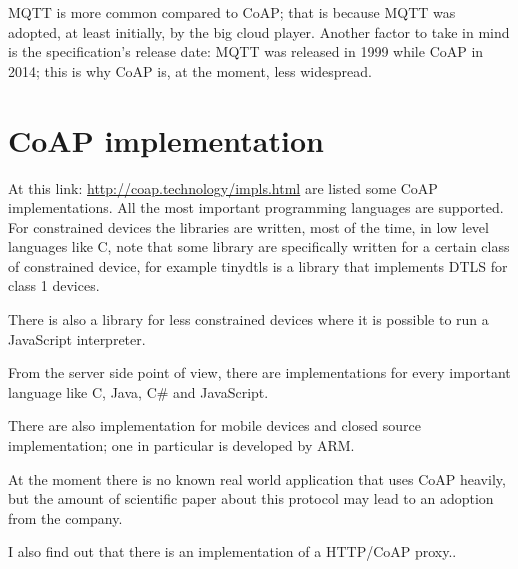 	MQTT is more common compared to CoAP; that is because MQTT was adopted, at least initially, by the big cloud player.\newline
	Another factor to take in mind is the specification's release date: MQTT was released in 1999 while CoAP in 2014; this is why CoAP is, at the moment, less widespread.\newline
	
	\section{CoAP implementation}
	At this link: \url{http://coap.technology/impls.html} are listed some CoAP implementations.\newline
	All the most important programming languages are supported.\newline
	For constrained devices the libraries are written, most of the time, in low level languages like C, note that some library are specifically written for a certain class of constrained device, for example tinydtls is a library that implements DTLS for class 1 devices.\newline
	
	There is also a library for less constrained devices where it is possible to run a JavaScript interpreter.\newline
	
	From the server side point of view, there are implementations for every important language like C, Java, C\# and JavaScript.\newline
	
	There are also implementation for mobile devices and closed source implementation; one in particular is developed by ARM.\newline
	
	At the moment there is no known real world application that uses CoAP heavily, but the amount of scientific paper about this protocol may lead to an adoption from the company.
	\newline
	
	I also find out that there is an implementation of a HTTP/CoAP proxy.\cite{rossini2012design}.